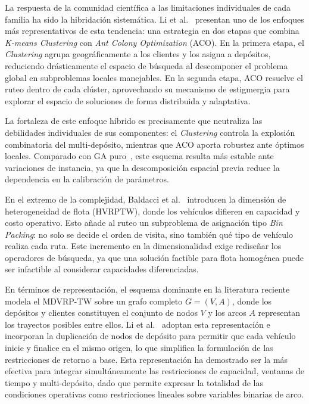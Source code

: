 \documentclass[letter, 10pt]{article}
\begin{document}
La respuesta de la comunidad cient\'ifica a las limitaciones individuales de cada familia ha sido la hibridaci\'on sistem\'atica. Li et al.~\cite{10603115} presentan uno de los enfoques m\'as representativos de esta tendencia: una estrategia en dos etapas que combina \textit{K-means Clustering} con \textit{Ant Colony Optimization} (ACO). En la primera etapa, el \textit{Clustering} agrupa geogr\'aficamente a los clientes y los asigna a dep\'ositos, reduciendo dr\'asticamente el espacio de b\'usqueda al descomponer el problema global en subproblemas locales manejables. En la segunda etapa, ACO resuelve el ruteo dentro de cada cl\'uster, aprovechando su mecanismo de estigmergia para explorar el espacio de soluciones de forma distribuida y adaptativa.

La fortaleza de este enfoque h\'ibrido es precisamente que neutraliza las debilidades individuales de sus componentes: el \textit{Clustering} controla la explosi\'on combinatoria del multi-dep\'osito, mientras que ACO aporta robustez ante \'optimos locales. Comparado con GA puro~\cite{zhang2024application}, este esquema resulta m\'as estable ante variaciones de instancia, ya que la descomposici\'on espacial previa reduce la dependencia en la calibraci\'on de par\'ametros.

En el extremo de la complejidad, Baldacci et al.~\cite{baldacci2008heterogeneous} introducen la dimensi\'on de heterogeneidad de flota (HVRPTW), donde los veh\'iculos difieren en capacidad y costo operativo. Esto a\~nade al ruteo un subproblema de asignaci\'on tipo \textit{Bin Packing}: no solo se decide el orden de visita, sino tambi\'en qu\'e tipo de veh\'iculo realiza cada ruta. Este incremento en la dimensionalidad exige redise\~nar los operadores de b\'usqueda, ya que una soluci\'on factible para flota homog\'enea puede ser infactible al considerar capacidades diferenciadas.

En t\'erminos de representaci\'on, el esquema dominante en la literatura reciente modela el MDVRP-TW sobre un grafo completo $G = (V, A)$, donde los dep\'ositos y clientes constituyen el conjunto de nodos $V$ y los arcos $A$ representan los trayectos posibles entre ellos. Li et al.~\cite{10603115} adoptan esta representaci\'on e incorporan la duplicaci\'on de nodos de dep\'osito para permitir que cada veh\'iculo inicie y finalice en el mismo origen, lo que simplifica la formulaci\'on de las restricciones de retorno a base. Esta representaci\'on ha demostrado ser la m\'as efectiva para integrar simult\'aneamente las restricciones de capacidad, ventanas de tiempo y multi-dep\'osito, dado que permite expresar la totalidad de las condiciones operativas como restricciones lineales sobre variables binarias de arco.
\end{document}
